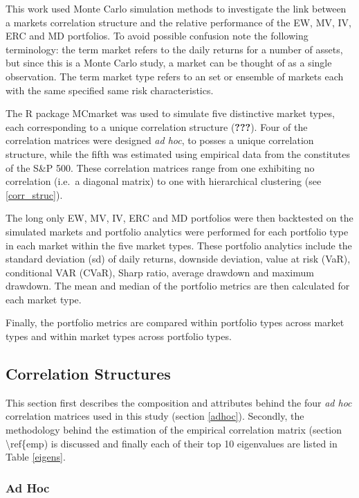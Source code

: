 \documentclass[11pt,preprint, authoryear]{elsarticle}
\numberwithin{equation}{section}
\numberwithin{figure}{section}
\numberwithin{table}{section}
\begin{document}
This work used Monte Carlo simulation methods to investigate the link
between a markets correlation structure and the relative performance of
the EW, MV, IV, ERC and MD portfolios. To avoid possible confusion note
the following terminology: the term market refers to the daily returns
for a number of assets, but since this is a Monte Carlo study, a market
can be thought of as a single observation. The term market type refers
to an set or ensemble of markets each with the same specified same risk
characteristics.

The R package MCmarket was used to simulate five distinctive market
types, each corresponding to a unique correlation structure
({\textbf{???}}). Four of the correlation matrices were designed
\emph{ad hoc}, to posses a unique correlation structure, while the fifth
was estimated using empirical data from the constitutes of the S\&P 500.
These correlation matrices range from one exhibiting no correlation
(i.e.~a diagonal matrix) to one with hierarchical clustering (see
\ref{corr_struc}).

The long only EW, MV, IV, ERC and MD portfolios were then backtested on
the simulated markets and portfolio analytics were performed for each
portfolio type in each market within the five market types. These
portfolio analytics include the standard deviation (sd) of daily
returns, downside deviation, value at risk (VaR), conditional VAR
(CVaR), Sharp ratio, average drawdown and maximum drawdown. The mean and
median of the portfolio metrics are then calculated for each market
type.

Finally, the portfolio metrics are compared within portfolio types
across market types and within market types across portfolio types.

\hypertarget{correlation-structures}{%
\subsection{\texorpdfstring{Correlation Structures
\label{corr_struc}}{Correlation Structures }}\label{correlation-structures}}

This section first describes the composition and attributes behind the
four \emph{ad hoc} correlation matrices used in this study (section
\ref{adhoc}). Secondly, the methodology behind the estimation of the
empirical correlation matrix (section \textbackslash ref\{emp) is
discussed and finally each of their top 10 eigenvalues are listed in
Table \ref{eigens}.

\hypertarget{ad-hoc}{%
\subsubsection{\texorpdfstring{Ad Hoc
\label{adhoc}}{Ad Hoc }}\label{ad-hoc}}
\end{document}
